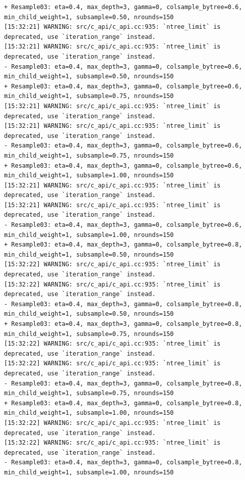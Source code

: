 \documentclass[
  letterpaper,
  DIV=11,
  numbers=noendperiod]{scrartcl}
\begin{document}
\begin{verbatim}
+ Resample03: eta=0.4, max_depth=3, gamma=0, colsample_bytree=0.6, min_child_weight=1, subsample=0.50, nrounds=150 
[15:32:21] WARNING: src/c_api/c_api.cc:935: `ntree_limit` is deprecated, use `iteration_range` instead.
[15:32:21] WARNING: src/c_api/c_api.cc:935: `ntree_limit` is deprecated, use `iteration_range` instead.
- Resample03: eta=0.4, max_depth=3, gamma=0, colsample_bytree=0.6, min_child_weight=1, subsample=0.50, nrounds=150 
+ Resample03: eta=0.4, max_depth=3, gamma=0, colsample_bytree=0.6, min_child_weight=1, subsample=0.75, nrounds=150 
[15:32:21] WARNING: src/c_api/c_api.cc:935: `ntree_limit` is deprecated, use `iteration_range` instead.
[15:32:21] WARNING: src/c_api/c_api.cc:935: `ntree_limit` is deprecated, use `iteration_range` instead.
- Resample03: eta=0.4, max_depth=3, gamma=0, colsample_bytree=0.6, min_child_weight=1, subsample=0.75, nrounds=150 
+ Resample03: eta=0.4, max_depth=3, gamma=0, colsample_bytree=0.6, min_child_weight=1, subsample=1.00, nrounds=150 
[15:32:21] WARNING: src/c_api/c_api.cc:935: `ntree_limit` is deprecated, use `iteration_range` instead.
[15:32:21] WARNING: src/c_api/c_api.cc:935: `ntree_limit` is deprecated, use `iteration_range` instead.
- Resample03: eta=0.4, max_depth=3, gamma=0, colsample_bytree=0.6, min_child_weight=1, subsample=1.00, nrounds=150 
+ Resample03: eta=0.4, max_depth=3, gamma=0, colsample_bytree=0.8, min_child_weight=1, subsample=0.50, nrounds=150 
[15:32:22] WARNING: src/c_api/c_api.cc:935: `ntree_limit` is deprecated, use `iteration_range` instead.
[15:32:22] WARNING: src/c_api/c_api.cc:935: `ntree_limit` is deprecated, use `iteration_range` instead.
- Resample03: eta=0.4, max_depth=3, gamma=0, colsample_bytree=0.8, min_child_weight=1, subsample=0.50, nrounds=150 
+ Resample03: eta=0.4, max_depth=3, gamma=0, colsample_bytree=0.8, min_child_weight=1, subsample=0.75, nrounds=150 
[15:32:22] WARNING: src/c_api/c_api.cc:935: `ntree_limit` is deprecated, use `iteration_range` instead.
[15:32:22] WARNING: src/c_api/c_api.cc:935: `ntree_limit` is deprecated, use `iteration_range` instead.
- Resample03: eta=0.4, max_depth=3, gamma=0, colsample_bytree=0.8, min_child_weight=1, subsample=0.75, nrounds=150 
+ Resample03: eta=0.4, max_depth=3, gamma=0, colsample_bytree=0.8, min_child_weight=1, subsample=1.00, nrounds=150 
[15:32:22] WARNING: src/c_api/c_api.cc:935: `ntree_limit` is deprecated, use `iteration_range` instead.
[15:32:22] WARNING: src/c_api/c_api.cc:935: `ntree_limit` is deprecated, use `iteration_range` instead.
- Resample03: eta=0.4, max_depth=3, gamma=0, colsample_bytree=0.8, min_child_weight=1, subsample=1.00, nrounds=150 

\end{verbatim}
\end{document}
